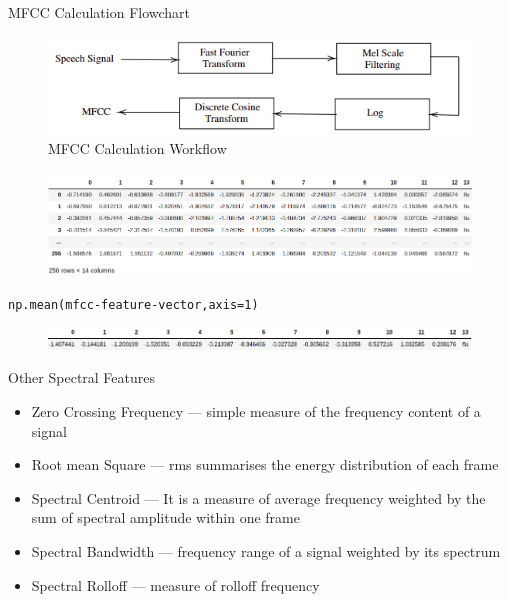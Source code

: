 \documentclass[11pt]{beamer}
\begin{document}
	\begin{frame}
		{MFCC Calculation Flowchart}
		\begin{figure}
			\centering
			\includegraphics[width=0.7\linewidth]{mfcc}
			\caption{MFCC Calculation Workflow}
			\label{fig:mfcc}
		\end{figure}
		
		\pause
		\begin{figure}
			\centering
			\includegraphics[width=0.8\linewidth]{mfcc-features}
			\label{fig:mfcc-features}
		\end{figure}
	
	\begin{center}
		\texttt{np.mean(mfcc-feature-vector,axis=1)}
	\end{center}
	\pause
	\begin{figure}
		\centering
		\includegraphics[width=0.8\linewidth]{fv}
	\end{figure}
		
	\end{frame}

	\begin{frame}
	{Other Spectral Features}	 %
	
	\begin{itemize}
		\item Zero Crossing Frequency --- simple measure of the frequency content of a signal
	\item Root mean Square --- rms summarises the energy distribution of each frame
	\item Spectral Centroid --- It is a measure of average frequency weighted by the sum of spectral amplitude within one frame
	\item Spectral Bandwidth --- frequency range of a signal weighted by its spectrum
	\item Spectral Rolloff --- measure of rolloff frequency
	
	\end{itemize}
\end{frame}
\end{document}
